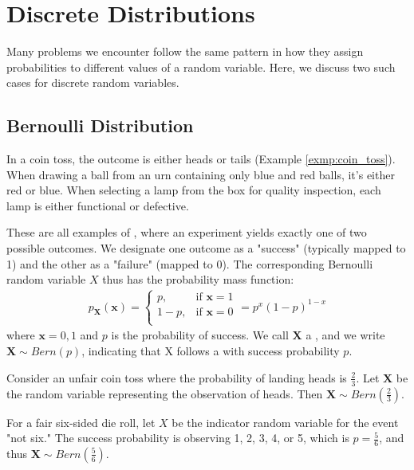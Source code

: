 \section{Discrete Distributions}

Many problems we encounter follow the same pattern in how they assign probabilities to different values of a random variable.
Here, we discuss two such cases for discrete random variables.

\subsection{Bernoulli Distribution}

In a coin toss, the outcome is either heads or tails (Example \autoref{exmp:coin_toss}).
When drawing a ball from an urn containing only blue and red balls, it's either red or blue.
When selecting a lamp from the box for quality inspection, each lamp is either functional or defective.

These are all examples of , where an experiment yields exactly one of two possible outcomes.
We designate one outcome as a "success" (typically mapped to 1) and the other as a "failure" (mapped to 0).
The corresponding Bernoulli random variable \( X \) thus has the probability mass function:
\begin{gather*}
    p_{\bm{X}}(\bm{x}) = \begin{cases}
        p, & \text{if } \bm{x} = 1\\
        1 - p, & \text{if } \bm{x} = 0\\
    \end{cases}
    = p^x(1 - p)^{1 - x}
\end{gather*}
where \( \bm{x} = 0, 1 \) and \( p \) is the probability of success.
We call \( \bm{X} \) a , and we write \( \bm{X} \sim Bern(p) \), indicating that X follows a  with success probability \( p \).
\begin{exmp}
    Consider an unfair coin toss where the probability of landing heads is \( \frac{2}{3} \).
    Let \( \bm{X} \) be the random variable representing the observation of heads. Then \( \bm{X} \sim Bern(\frac{2}{3}) \).
\end{exmp}
\begin{exmp}
    For a fair six-sided die roll, let \( X \) be the indicator random variable for the event "not six."
    The success probability is observing 1, 2, 3, 4, or 5,
    which is \( p = \frac{5}{6} \),
    and thus \( \bm{X} \sim Bern(\frac{5}{6}) \).
\end{exmp}

